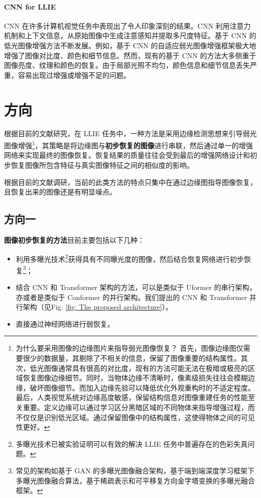 \documentclass[a4paper, 10pt]{article}
\begin{document}
	\paragraph{CNN for LLIE}
	
	CNN 在许多计算机视觉任务中表现出了令人印象深刻的结果。CNN 利用注意力机制\cite{yang2021locally, zhang2020attention}和上下文信息，从原始图像中生成注意感知并提取多尺度特征\cite{li2018multi,zamir2020learning}。基于 CNN 的低光图像增强方法不断发展。例如，基于 CNN 的自适应弱光图像增强框架\cite{li2020visual}极大地增强了图像对比度、颜色和细节信息。然而，现有的基于 CNN 的方法大多侧重于图像亮度、纹理和颜色的恢复\cite{xu2020learning}。由于局部光照不均匀，颜色信息和细节信息丢失严重，容易出现过增强或增强不足的问题。
	
	\section{方向}
	
	根据目前的文献研究，在 LLIE 任务中，一种方法是采用边缘检测思想来引导弱光图像增强\footnote{为什么要采用图像的边缘图片来指导弱光图像恢复？
		首先，图像边缘图仅需要很少的数据量，其剔除了不相关的信息，保留了图像重要的结构属性。其次，低光图像通常具有很高的对比度，现有的方法可能无法在极暗或极亮的区域恢复图像边缘细节。同时，当物体边缘不清晰时，像素级损失往往会模糊边缘，破坏图像细节。而加入边缘先验可以降低优化外观重构时的不适定程度。最后，人类视觉系统对边缘高度敏感，保留结构信息对图像重建任务的性能至关重要。定义边缘可以通过学习区分黑暗区域的不同物体来指导增强过程，而不仅仅是识别低光区域。通过保留图像中的结构属性，这使得物体之间的可见性更好。}，其策略是将边缘图与\textbf{初步恢复的图像}进行串联，然后通过单一的增强网络来实现最终的图像恢复。恢复结果的质量往往会受到最后的增强网络设计和初步恢复图像所包含特征与真实图像特征之间的相似度的影响。
	
	根据目前的文献调研，当前的此类方法的特点只集中在通过边缘图指导图像恢复，且恢复出来的图像还是有明显噪点。
	
	\subsection{方向一}
	
	\textbf{图像初步恢复的方法}目前主要包括以下几种：
	
	\begin{itemize}
		\item[(1)] 
		利用多曝光技术\footnote{多曝光技术已被实验证明可以有效的解决 LLIE 任务中普遍存在的色彩失真问题。}获得具有不同曝光度的图像，然后结合恢复网络进行初步恢复\footnote{常见的架构如基于 GAN 的多曝光图像融合架构，基于端到端深度学习框架下多曝光图像融合算法，基于稀疏表示和可平移复方向金字塔变换的多曝光融合框架。}；
		
		\item[(2)]
		结合 CNN 和 Transformer 架构的方法，可以是类似于 Uformer \cite{wang2022uformer}的串行架构，亦或者是类似于 Conformer 的并行架构。我们提出的 CNN 和 Transformer 并行架构（见Fig. \ref{fig: The proposed architecture}）。
		
		\item[(3)]
		直接通过神经网络进行弱恢复。
		
	\end{itemize}	
	
\end{document}
